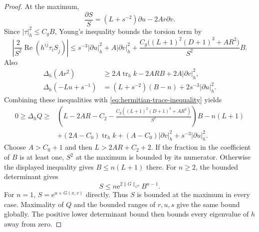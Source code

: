 \begin{proof}
At the maximum,
\[
 \frac{\partial S}{S}=(L+s^{-2})\partial u-2Ar\partial v.
\]
Since $|\tau|_h^2\leq C_gB$, Young's inequality bounds the torsion term by
\[
 \left|\frac2{S^2}\operatorname{Re}(h^{i\bar j}\tau_iS_{\bar j})\right|
 \leq s^{-3}|\partial u|_h^2+A|\partial v|_h^2
   +\frac{C_g\bigl((L+1)^2(D+1)^3+AR^2\bigr)}{S^2}B.
\]
Also
\begin{align*}
 \Delta_h(Ar^2)&\geq2A\operatorname{tr}_hk-2AR B+2A|\partial v|_h^2,\\
 \Delta_h(-Lu+s^{-1})&=(L+s^{-2})(B-n)+2s^{-3}|\partial u|_h^2.
\end{align*}
Combining these inequalities with \eqref{eq:hermitian-trace-inequality} yields
\[
 \begin{split}
 0\geq\Delta_hQ\geq{}&
 \left(L-2AR-C_2-
   \frac{C_g((L+1)^2(D+1)^3+AR^2)}{S^2}\right)B-n(L+1)\\
 &+(2A-C_0)\operatorname{tr}_hk+(A-C_0)|\partial v|_h^2
    +s^{-3}|\partial u|_h^2.
 \end{split}
\]
Choose $A>C_0+1$ and then $L>2AR+C_2+2$. If the fraction in the coefficient of $B$ is at least one, $S^2$ at the maximum is bounded by its numerator. Otherwise the displayed inequality gives $B\leq n(L+1)$ there.
For $n\geq2$, the bounded determinant gives
\[
 S\leq n\mathrm e^{2\|G\|_{C^0}}B^{n-1}.
\]
For $n=1$, $S=\mathrm e^{u+G(x,v)}$ directly.
Thus $S$ is bounded at the maximum in every case. Maximality of $Q$ and the bounded ranges of $r,u,s$ give the same bound globally. The positive lower determinant bound then bounds every eigenvalue of $h$ away from zero.
\end{proof}

